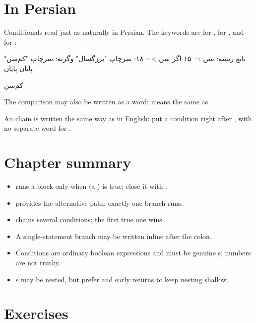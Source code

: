 \section{In Persian}

Conditionals read just as naturally in Persian. The keywords are 
for ,  for , and  for
:

\begin{salamfa}
تابع ریشه:
    سن := ۱۵
    اگر سن >= ۱۸:
        سرچاپ "بزرگسال"
    وگرنه:
        سرچاپ "کم‌سن"
    پایان
پایان
\end{salamfa}

\begin{progout}
کم‌سن
\end{progout}

The comparison may also be written as a word:  means
the same as .

An  chain is written the same way as in English: put a condition
right after , with no separate word for .

\section{Chapter summary}

\begin{itemize}[leftmargin=1.4em]
  \item {} runs a block only when  (a ) is
        true; close it with .
  \item {} provides the alternative path; exactly one branch runs.
  \item {} chains several conditions; the first true one wins.
  \item A single-statement branch may be written inline after the colon.
  \item Conditions are ordinary boolean expressions and must be genuine
        s; numbers are not truthy.
  \item {}s may be nested, but prefer  and early returns to keep
        nesting shallow.
\end{itemize}

\section{Exercises}

